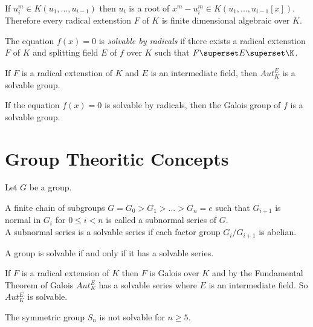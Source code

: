 \begin{remark}
If \(u_i^m \in K(u_1,...,u_{i-1})\) then \(u_i\) is a root of \(x^m-u_i^m \in K(u_1,...,u_{i-1}[x])\). \\
Therefore every radical extenstion \(F\) of \(K\) is finite dimensional algebraic over \(K\).
\end{remark}

\begin{definition}
The equation \(f(x)=0\) is \textit{solvable by radicals} if there exists a radical extenstion \(F\) of \(K\) and splitting field \(E\) of \(f\) over \(K\) such that \(F \superset E \superset \K\).
\end{definition}

\begin{theorem}
If \(F\) is a radical extenstion of \(K\) and \(E\) is an intermediate field, then \(Aut_K^E\) is a solvable group.
\end{theorem}

\begin{corollary}
If the equation \(f(x)=0\) is solvable by radicals, then the Galois group of \(f\) is a solvable group.
\end{corollary}

\section{Group Theoritic Concepts}
Let \(G\) be a group. 

\begin{definition}
A finite chain of subgroups \(G=G_0>G_1>...>G_n={e}\) such that \(G_{i+1}\) is normal in \(G_i\) for \(0 \leq i < n\) is called a subnormal series of \(G\).\\
A subnormal series is a solvable series if each factor group \(G_i/G_{i+1}\) is abelian.
\end{definition}

\begin{definition}
A group is solvable if and only if it has a solvable series.
\end{definition}

If \(F\) is a radical extension of \(K\) then \(F\) is Galois over \(K\) and by the Fundamental Theorem of Galois \(Aut_K^E\) has a solvable series where \(E\) is an intermediate field. So \(Aut_K^E\) is solvable.

\begin{theorem}
The symmetric group \(S_n\) is not solvable for \(n \geq 5\).
\end{theorem}

